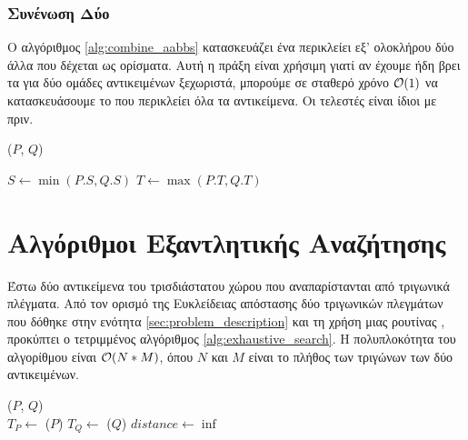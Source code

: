 \subsubsection{Συνένωση Δύο }
Ο αλγόριθμος \ref{alg:combine_aabbs} κατασκευάζει ένα  περικλείει
εξ' ολοκλήρου δύο άλλα  που δέχεται ως ορίσματα. 
Αυτή η πράξη είναι χρήσιμη γιατί αν έχουμε ήδη βρει τα  για δύο 
ομάδες αντικειμένων ξεχωριστά, μπορούμε σε σταθερό χρόνο $\mathcal{O}(1)$ να 
κατασκευάσουμε το  που περικλείει όλα τα αντικείμενα. 
Οι τελεστές  είναι ίδιοι με πριν.

\IncMargin{1.5em}
\begin{algorithm}[H]
    \label{alg:combine_aabbs}
    \caption[Κατασκευή  από δύο άλλα ]{
    }
    \DontPrintSemicolon
    \Indm\nonl\funcname($P$, $Q$)\\
    \Indp
        
    $S \gets \min(P.S, Q.S)$\;
    $T \gets \max(P.T, Q.T)$\; 
\end{algorithm}
\DecMargin{1.5em}

\section{Αλγόριθμοι Εξαντλητικής Αναζήτησης}
\label{sec:exhaustive_search}
Έστω δύο αντικείμενα του τρισδιάστατου χώρου που αναπαρίστανται από 
τριγωνικά πλέγματα.
Από τον ορισμό της Ευκλείδειας απόστασης δύο τριγωνικών πλεγμάτων που
δόθηκε στην ενότητα \ref{sec:problem_description} και τη χρήση μιας 
ρουτίνας , προκύπτει ο 
τετριμμένος αλγόριθμος \ref{alg:exhaustive_search}. 
Η πολυπλοκότητα του αλγορίθμου είναι $\mathcal{O}(N*M)$, όπου 
$N$ και $M$ είναι το πλήθος των τριγώνων των δύο αντικειμένων.

\IncMargin{1.5em}
\begin{algorithm}[h]

    \caption[Απόσταση Τριγωνικών Πλεγμάτων με Πλήρη Αναζήτηση]{
    }
    \label{alg:exhaustive_search}
    \DontPrintSemicolon
    \Indm\nonl\exhaustivesearch ($P$, $Q$)\\
    \Indp
        $T_P \gets$ \trias($P$) \;
        $T_Q \gets$ \trias($Q$) \; 
        $distance \gets \inf$ \;
\end{algorithm}
\DecMargin{1.5em}

